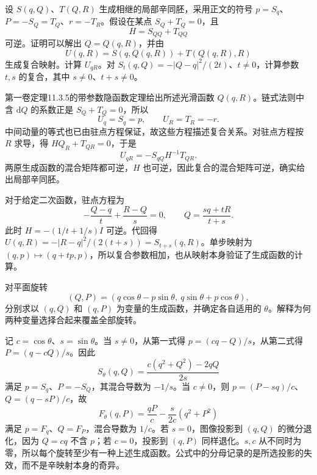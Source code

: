 \begin{exercise}\label{g4:ex:0804:composition}
	设 \(S(q,Q)\)、\(T(Q,R)\) 生成相继的局部辛同胚，采用正文的符号 \(p=S_q\)、\(P=-S_Q=T_Q\)、\(r=-T_R\)。假设在某点 \(S_Q+T_Q=0\)，且
	\[
		H=S_{QQ}+T_{QQ}
	\]
	可逆。证明可以解出 \(Q=Q(q,R)\)，并由
	\[
		U(q,R)=S(q,Q(q,R))+T(Q(q,R),R)
	\]
	生成复合映射。计算 \(U_{qR}\)。对 \(S_t(q,Q)=-|Q-q|^2/(2t)\)、\(t\ne0\)，计算参数 \(t,s\) 的复合，其中 \(s\ne0\)、\(t+s\ne0\)。
\end{exercise}
\begin{solution}
	第一卷定理11.3.5的带参数隐函数定理给出所述光滑函数 \(Q(q,R)\)。链式法则中含 \(\mathrm{d}Q\) 的系数正是 \(S_Q+T_Q=0\)，所以
	\[
		U_q=S_q=p,\qquad U_R=T_R=-r.
	\]
	中间动量的等式也已由驻点方程保证，故这些方程描述复合关系。对驻点方程按 \(R\) 求导，得 \(H Q_R+T_{QR}=0\)，于是
	\[
		U_{qR}=-S_{qQ}H^{-1}T_{QR}.
	\]
	两原生成函数的混合矩阵都可逆，\(H\) 也可逆，因此复合的混合矩阵可逆，确实给出局部辛同胚。

	对于给定二次函数，驻点方程为
	\[
		-\frac{Q-q}{t}+\frac{R-Q}{s}=0,
		\qquad Q=\frac{s q+tR}{t+s}.
	\]
	此时 \(H=-(1/t+1/s)I\) 可逆。代回得 \(U(q,R)=-|R-q|^2/(2(t+s))=S_{t+s}(q,R)\)。单步映射为 \((q,p)\mapsto(q+tp,p)\)，所以复合参数相加，也从映射本身验证了生成函数的计算。
\end{solution}

\begin{exercise}\label{g4:ex:0804:rotation-functions}
	对平面旋转
	\[
		(Q,P)=(q\cos\theta-p\sin\theta,\ q\sin\theta+p\cos\theta),
	\]
	分别求以 \((q,Q)\) 和 \((q,P)\) 为变量的生成函数，并确定各自适用的 \(\theta\)。解释为何两种变量选择合起来覆盖全部旋转。
\end{exercise}
\begin{solution}
	记 \(c=\cos\theta\)、\(s=\sin\theta\)。当 \(s\ne0\)，从第一式得 \(p=(cq-Q)/s\)，从第二式得 \(P=(q-cQ)/s\)。因此
	\[
		S_\theta(q,Q)=\frac{c(q^2+Q^2)-2qQ}{2s}
	\]
	满足 \(p=S_q\)、\(P=-S_Q\)，其混合导数为 \(-1/s\)。当 \(c\ne0\)，则 \(p=(P-sq)/c\)、\(Q=(q-sP)/c\)，故
	\[
		F_\theta(q,P)=\frac{qP}{c}-\frac{s}{2c}(q^2+P^2)
	\]
	满足 \(p=F_q\)、\(Q=F_P\)，混合导数为 \(1/c\)。若 \(s=0\)，图像投影到 \((q,Q)\) 的微分退化，因为 \(Q=cq\) 不含 \(p\)；若 \(c=0\)，投影到 \((q,P)\) 同样退化。\(s,c\) 从不同时为零，所以每个旋转至少有一种上述生成函数。公式中的分母记录的是所选投影的失效，而不是辛映射本身的奇异。
\end{solution}

